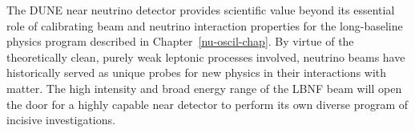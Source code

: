 
The DUNE near neutrino detector provides scientific value beyond
      its essential role of calibrating beam and neutrino interaction
      properties for the long-baseline physics program described in
      Chapter~\ref{nu-oscil-chap}.
      By virtue of the theoretically clean, purely weak leptonic
      processes involved,
      neutrino beams have historically served as unique probes for
      new physics in their interactions with matter.
      The high intensity and broad energy range of the LBNF beam
      will open the door for a highly capable near detector
      to perform its own diverse
program of incisive investigations. 

